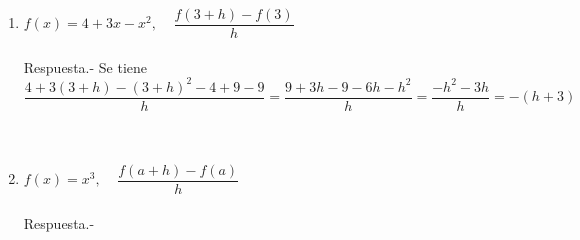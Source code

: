 \begin{enumerate}
    \item $f(x)=4+3x-x^2, \;\;\;\; \dfrac{f(3+h)-f(3)}{h}$\\\\
	Respuesta.-\; Se tiene $$\dfrac{4 + 3(3+h)-(3+h)^2-4+9-9}{h}=\dfrac{9+3h-9-6h-h^2}{h}=\dfrac{-h^2 -3h}{h}=-(h+3)$$\\\\

    \item $f(x)=x^3, \;\;\;\; \dfrac{f(a+h)-f(a)}{h}$\\\\
	Respuesta.-\;

    \end{enumerate}
